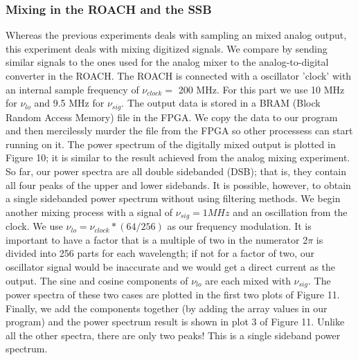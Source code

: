 \documentclass[12pt]{article}
\begin{document}
\subsubsection{Mixing in the ROACH and the SSB}
Whereas the previous experiments deals with sampling an mixed analog output,
this experiment deals with mixing digitized signals. We compare by
sending similar signals to the ones used for the analog mixer to the
analog-to-digital converter in the ROACH. The ROACH is connected with a 
oscillator 'clock' with an internal sample frequency of $\nu_{clock} =$ 200 MHz. For
this part we use 10 MHz for $\nu_{lo}$ and 9.5 MHz for $\nu_{sig}$. The
output data is stored in a BRAM (Block Random Access Memory) file in the
FPGA. We copy the data to our program and then mercilessly murder the
file from the FPGA so other processess can start running on it. The
power spectrum of the digitally mixed output is plotted in Figure 10; it
is similar to the result achieved from the analog mixing experiment. So
far, our power spectra are all double sidebanded (DSB); that is, they
contain all four peaks of the upper and lower sidebands. It is possible,
however, to obtain a single sidebanded power spectrum without using
filtering methods. We begin another mixing process with a signal of
$\nu_{sig} = 1 MHz$ and an oscillation from the clock. We use $\nu_{lo}
= \nu_{clock} * (64/256)$ as our frequency modulation. It is important
to have a factor that is a multiple of two in the numerator 2$\pi$ is
divided into 256 parts for each wavelength; if not for a factor of two,
our oscillator signal would be inaccurate and we would get a direct
current as the output. The sine and cosine components of $\nu_{lo}$ are
each mixed with $\nu_{sig}$. The power spectra of these two cases are
plotted in the first two plots of Figure 11. Finally, we add the
components together (by adding the array values in our program) and the
power spectrum result is shown in plot 3 of Figure 11. Unlike all the
other spectra, there are only two peaks! This is a single sideband power
spectrum. 
\end{document}
